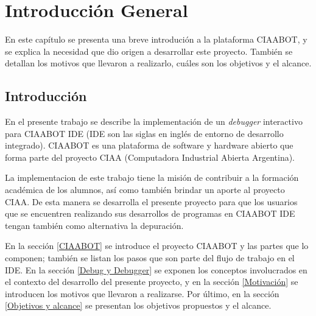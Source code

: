 
\chapter{Introducción General} %

\label{Chapter1} %
\label{IntroGeneral}
En este capítulo se presenta una breve introdución a la plataforma CIAABOT, y se
explica la necesidad que dio origen a desarrollar este proyecto. También se detallan
los motivos que llevaron a realizarlo, cuáles son los objetivos y el alcance.


\newcommand{\keyword}[1]{\textbf{#1}}
\newcommand{\tabhead}[1]{\textbf{#1}}
\newcommand{\code}[1]{\texttt{#1}}
\newcommand{\file}[1]{\texttt{\bfseries#1}}
\newcommand{\option}[1]{\texttt{\itshape#1}}
\newcommand{\grados}{$^{\circ}$}



\section{Introducción}
\label{Introducción}
En el presente trabajo se describe la implementación de un \emph{debugger} interactivo
para CIAABOT IDE (IDE son las siglas en inglés de entorno de desarrollo integrado). CIAABOT es una plataforma de software y hardware abierto que forma parte del proyecto CIAA (Computadora Industrial Abierta Argentina)\citep{CIAA}. 


La implementacion de este trabajo tiene la misión de contribuir a la formación
académica de los alumnos, así como también brindar un aporte al proyecto CIAA.
De esta manera se desarrolla el presente proyecto para que los usuarios que se encuentren
realizando sus desarrollos de programas en CIAABOT IDE tengan también como alternativa la depuración.

En la sección \ref{CIAABOT} se introduce el proyecto CIAABOT y las partes que lo componen; también se listan los pasos que son parte del flujo de trabajo en el IDE.
En la sección \ref{Debug y Debugger} se exponen los conceptos involucrados en el contexto del desarrollo del presente proyecto, y en la sección \ref{Motivación} se introducen los motivos que llevaron a realizarse. Por último, en la sección \ref{Objetivos y alcance} se presentan los objetivos propuestos y el alcance.


